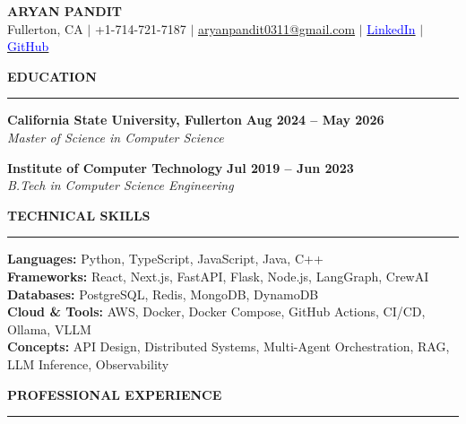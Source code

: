 \documentclass{article}
\begin{document}
\begin{center}
\thispagestyle{empty}

\large \textbf{ARYAN PANDIT} \\
Fullerton, CA $\mid$ +1-714-721-7187 $\mid$
\href{mailto:aryanpandit0311@gmail.com}{aryanpandit0311@gmail.com} $\mid$
\href{https://linkedin.com/in/aryanpandit0311}{\textcolor{blue}{LinkedIn}} $\mid$
\href{https://github.com/aryanpandit0311}{\textcolor{blue}{GitHub}}
\end{center}

\vspace{3mm}
\noindent \textbf{EDUCATION} \vspace{-8pt} \\
\rule{\linewidth}{0.5pt}

\noindent \textbf{California State University, Fullerton} \hfill \textbf{Aug 2024 -- May 2026} \\
\textit{Master of Science in Computer Science}

\vspace{1.5mm}

\noindent \textbf{Institute of Computer Technology} \hfill \textbf{Jul 2019 -- Jun 2023} \\
\textit{B.Tech in Computer Science Engineering}

\vspace{3mm}
\noindent \textbf{TECHNICAL SKILLS} \vspace{-8pt} \\
\rule{\linewidth}{0.5pt}

\noindent \textbf{Languages:} Python, TypeScript, JavaScript, Java, C++ \\
\textbf{Frameworks:} React, Next.js, FastAPI, Flask, Node.js, LangGraph, CrewAI \\
\textbf{Databases:} PostgreSQL, Redis, MongoDB, DynamoDB \\
\textbf{Cloud \& Tools:} AWS, Docker, Docker Compose, GitHub Actions, CI/CD, Ollama, VLLM \\
\textbf{Concepts:} API Design, Distributed Systems, Multi-Agent Orchestration, RAG, LLM Inference, Observability

\vspace{3mm}
\noindent \textbf{PROFESSIONAL EXPERIENCE} \vspace{-8pt} \\
\rule{\linewidth}{0.5pt}

\vspace{3mm}
\end{document}
